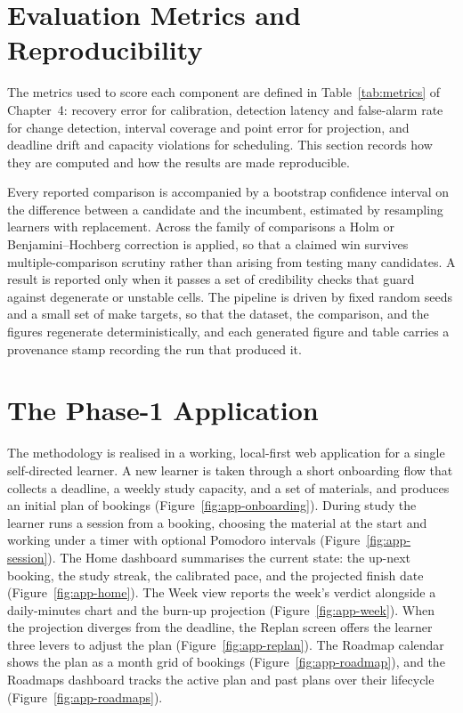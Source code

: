 \section{Evaluation Metrics and Reproducibility}
The metrics used to score each component are defined in Table~\ref{tab:metrics} of Chapter~4: recovery error for calibration, detection latency and false-alarm rate for change detection, interval coverage and point error for projection, and deadline drift and capacity violations for scheduling. This section records how they are computed and how the results are made reproducible.

Every reported comparison is accompanied by a bootstrap confidence interval on the difference between a candidate and the incumbent, estimated by resampling learners with replacement. Across the family of comparisons a Holm or Benjamini--Hochberg correction is applied, so that a claimed win survives multiple-comparison scrutiny rather than arising from testing many candidates. A result is reported only when it passes a set of credibility checks that guard against degenerate or unstable cells. The pipeline is driven by fixed random seeds and a small set of make targets, so that the dataset, the comparison, and the figures regenerate deterministically, and each generated figure and table carries a provenance stamp recording the run that produced it.

\section{The Phase-1 Application}
The methodology is realised in a working, local-first web application for a single self-directed learner. A new learner is taken through a short onboarding flow that collects a deadline, a weekly study capacity, and a set of materials, and produces an initial plan of bookings (Figure~\ref{fig:app-onboarding}). During study the learner runs a session from a booking, choosing the material at the start and working under a timer with optional Pomodoro intervals (Figure~\ref{fig:app-session}). The Home dashboard summarises the current state: the up-next booking, the study streak, the calibrated pace, and the projected finish date (Figure~\ref{fig:app-home}). The Week view reports the week's verdict alongside a daily-minutes chart and the burn-up projection (Figure~\ref{fig:app-week}). When the projection diverges from the deadline, the Replan screen offers the learner three levers to adjust the plan (Figure~\ref{fig:app-replan}). The Roadmap calendar shows the plan as a month grid of bookings (Figure~\ref{fig:app-roadmap}), and the Roadmaps dashboard tracks the active plan and past plans over their lifecycle (Figure~\ref{fig:app-roadmaps}).

